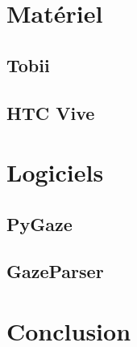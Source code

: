 \documentclass{article}
\begin{document}
  \section{Matériel}

  \subsection{Tobii}

  \subsection{HTC Vive}


  \section{Logiciels}

  \subsection{PyGaze}

  \subsection{GazeParser}


  \section{Conclusion}
\end{document}
